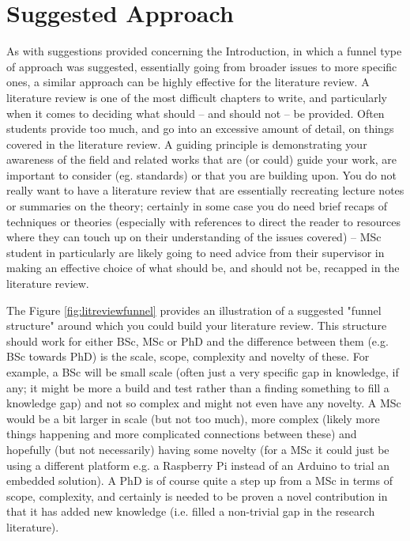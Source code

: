 
\section{Suggested Approach}

As with suggestions provided concerning the Introduction, in which a funnel type of approach was suggested, essentially going from broader issues to more specific ones, a similar approach can be highly effective for the literature review. A literature review is one of the most difficult chapters to write, and particularly when it comes to deciding what should -- and should not -- be provided. Often students provide too much, and go into an excessive amount of detail, on things covered in the literature review. A guiding principle is demonstrating your awareness of the field and related works that are (or could) guide your work, are important to consider (eg. standards) or that you are building upon. You do not really want to have a literature review that are essentially recreating lecture notes or summaries on the theory; certainly in some case you do need brief recaps of techniques or theories (especially with references to direct the reader to resources where they can touch up on their understanding of the issues covered) -- MSc student in particularly are likely going to need advice from their supervisor in making an effective choice of what should be, and should not be, recapped in the literature review.

The Figure \ref{fig:litreviewfunnel} provides an illustration of a suggested "funnel structure" around which you could build your literature review. This structure should work for either BSc, MSc or PhD and the difference between them (e.g. BSc towards PhD) is the scale, scope, complexity and novelty of these. For example, a BSc will be small scale (often just a very specific gap in knowledge, if any; it might be more a build and test rather than a finding something to fill a knowledge gap) and not so complex and might not even have any novelty. A MSc would be a bit larger in scale (but not too much), more complex (likely more things happening and more complicated connections between these) and hopefully (but not necessarily) having some novelty (for a MSc it could just be using a different platform e.g. a Raspberry Pi instead of an Arduino to trial an embedded solution). A PhD is of course quite a step up from a MSc in terms of scope, complexity, and certainly is needed to be proven a novel contribution in that it has added new knowledge (i.e. filled a non-trivial gap in the research literature).

